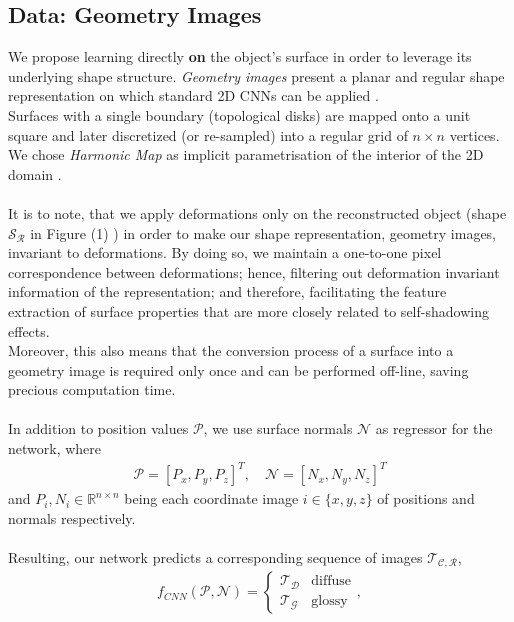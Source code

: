 \subsection{Data: Geometry Images}
We propose learning directly \textbf{on} the object's surface in order to leverage its underlying shape structure. \textit{Geometry images} present a planar and regular shape representation on which standard 2D CNNs can be applied \cite{gu2002geometry, sinha2016deep}. 
\\ 
Surfaces with a single boundary (topological disks) are mapped onto a unit square and later discretized (or re-sampled) into a regular grid of $n \times n$ vertices. We chose \textit{Harmonic Map} as implicit parametrisation of the interior of the 2D domain \cite{HM_book, HarmonicMapping}. \\
\\
It is to note, that we apply deformations only on the reconstructed object (shape $\mathcal{S_R}$ in Figure (1) ) in order to make our shape representation, geometry images, invariant to deformations. By doing so, we maintain a one-to-one pixel correspondence between deformations; hence, filtering out deformation invariant information of the representation; and therefore, facilitating the feature extraction of surface properties that are more closely related to self-shadowing effects. 
\\
Moreover, this also means that the conversion process of a surface into a geometry image is required only once and can be performed off-line, saving precious computation time.\\
\\
In addition to position values  $\mathcal{P}$, we use surface normals $\mathcal{N}$ as regressor for the network, where 
\begin{align*}
	\mathcal{P} = [ P_x, P_y, P_z ]^T , \quad
	\mathcal{N} = [ N_x, N_y, N_z ] ^T 
\end{align*}
and  $P_i, N_i \in \mathbb{R}^{n \times n }$ being each coordinate image  $i \in \{ x,y,z\}$ of positions and normals respectively. 
\\
\\
Resulting, our network predicts a corresponding sequence of images $\mathcal{T_{C,R}}$,
\begin{align*}
	f_{CNN} (  \mathcal{P} , \mathcal{N} ) = 
	\begin{cases}
	\mathcal{T_D}  & \text{diffuse} \\
	\mathcal{T_G} & \text{glossy}
	\end{cases},
\end{align*}
